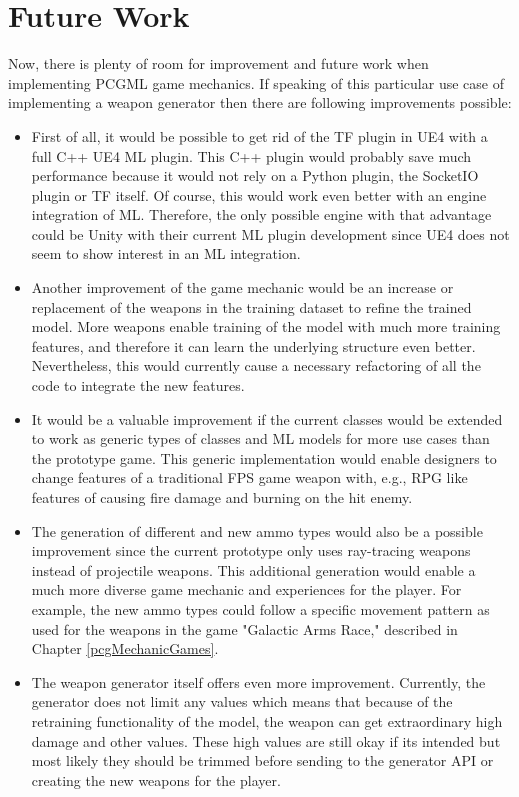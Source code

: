 \documentclass[MGS,Master,english]{twbook}%
\begin{document}
\section{Future Work}
Now, there is plenty of room for improvement and future work when implementing PCGML game mechanics. If speaking of this particular use case of implementing a weapon generator then there are following improvements possible:
\begin{itemize}
	\item First of all, it would be possible to get rid of the TF plugin in UE4 with a full C++ UE4 ML plugin. This C++ plugin would probably save much performance because it would not rely on a Python plugin, the SocketIO plugin or TF itself. Of course, this would work even better with an engine integration of ML. Therefore, the only possible engine with that advantage could be Unity with their current ML plugin development since UE4 does not seem to show interest in an ML integration. 
	\item Another improvement of the game mechanic would be an increase or replacement of the weapons in the training dataset to refine the trained model. More weapons enable training of the model with much more training features, and therefore it can learn the underlying structure even better. \\
	Nevertheless, this would currently cause a necessary refactoring of all the code to integrate the new features.
	\item It would be a valuable improvement if the current classes would be extended to work as generic types of classes and ML models for more use cases than the prototype game. This generic implementation would enable designers to change features of a traditional FPS game weapon with, e.g., RPG like features of causing fire damage and burning on the hit enemy.
	\item The generation of different and new ammo types would also be a possible improvement since the current prototype only uses ray-tracing weapons instead of projectile weapons. This additional generation would enable a much more diverse game mechanic and experiences for the player. For example, the new ammo types could follow a specific movement pattern as used for the weapons in the game "Galactic Arms Race," described in Chapter \ref{pcgMechanicGames}.
	\item The weapon generator itself offers even more improvement. Currently, the generator does not limit any values which means that because of the retraining functionality of the model, the weapon can get extraordinary high damage and other values. These high values are still okay if its intended but most likely they should be trimmed before sending to the generator API or creating the new weapons for the player.

\end{itemize}
\end{document}
